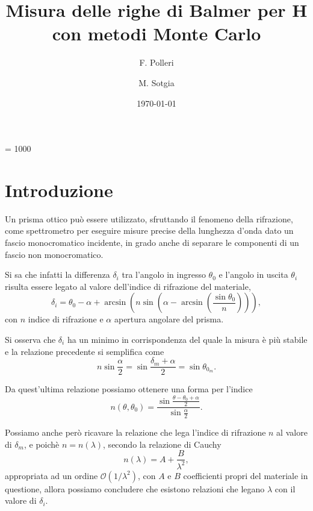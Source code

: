 \documentclass[a4paper,preprintnumbers,aps,citeautoscript,notitlepage,12pt,tightenlines]{revtex4-2}
\begin{document}
\count\footins = 1000
\title{Misura delle righe di Balmer per H con metodi Monte Carlo}
\author{F. Polleri}
\author{M. Sotgia}
\date{\today}
\maketitle

\section{Introduzione}
Un prisma ottico può essere utilizzato, sfruttando il fenomeno della rifrazione, come spettrometro per eseguire misure precise della lunghezza d'onda dato un fascio monocromatico incidente, in grado anche di separare le componenti di un fascio non monocromatico. 

Si sa che infatti la differenza $\delta_i$ tra l'angolo in ingresso $\theta_0$ e l'angolo in uscita $\theta_i$ risulta essere legato al valore dell'indice di rifrazione del materiale, \begin{equation}\delta_i = \theta_0 - \alpha+\arcsin\left(n\sin\left(\alpha - \arcsin\left(\frac{\sin\theta_0}{n}\right)\right)\right),\end{equation} con $n$ indice di rifrazione e $\alpha$ apertura angolare del prisma. 

Si osserva che $\delta_i$ ha un minimo in corrispondenza del quale la misura è più stabile e la relazione precedente si semplifica come \begin{equation} n\sin\frac{\alpha}{2} = \sin\frac{\delta_m + \alpha}{2} = \sin\theta_{0_m}.\end{equation}

Da quest'ultima relazione possiamo ottenere una forma per l'indice \begin{equation} n(\theta, \theta_0) = \frac{\sin\frac{\theta-\theta_0 + \alpha}{2}}{\sin\frac{\alpha}{2}}.\end{equation}

Possiamo anche però ricavare la relazione che lega l'indice di rifrazione $n$ al valore di $\delta_m$, e poichè $n=n(\lambda)$, secondo la relazione di Cauchy \begin{equation} n(\lambda) = A + \frac{B}{\lambda^2},\end{equation} appropriata ad un ordine $\mathcal O (1/\lambda^2)$, con $A$ e $B$ coefficienti propri del materiale in questione, allora possiamo concludere che esistono relazioni che legano $\lambda$ con il valore di $\delta_i$. 
\end{document}
